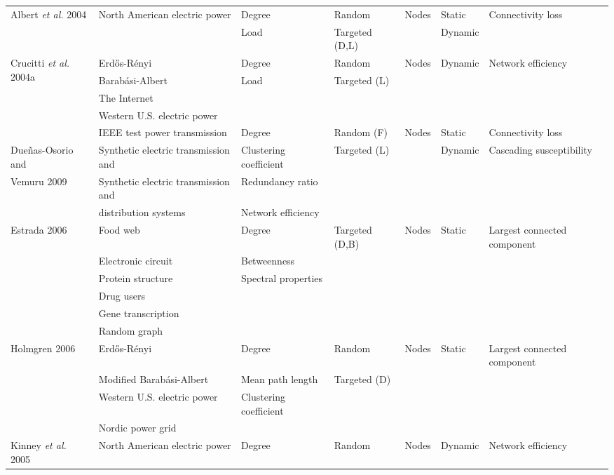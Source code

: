 \begin{landscape}
\begin{table}[h!]
{\begin{tabular}{lllllll}
\multirow{2}{*}{Albert \emph{et al.} 2004 \cite{Albert2004}} & North American electric power & Degree & Random & Nodes & Static & Connectivity loss \\
 &  & Load & Targeted (D,L) &  & Dynamic &  \\ \midrule
\multirow{4}{*}{Crucitti \emph{et al.} 2004a \cite{Crucitti2004a}} & Erd\H{o}s-R\'{e}nyi & Degree & Random & Nodes & Dynamic & Network efficiency \\
 & Barab\'{a}si-Albert & Load & Targeted (L) &  &  &  \\
 & The Internet &  &  &  &  &  \\
 & Western U.S. electric power &  &  &  &  &  \\ \midrule
  & IEEE test power transmission & Degree & Random (F) & Nodes & Static & Connectivity loss \\
Due\~{n}as-Osorio and & Synthetic electric transmission and & Clustering coefficient & Targeted (L) &  & Dynamic & Cascading susceptibility \\
Vemuru 2009 \cite{Duenas-Osorio2009} & Synthetic electric transmission and & Redundancy ratio &  &  &  &  \\
 & distribution systems & Network efficiency &  &  &  &  \\ \midrule
\multirow{6}{*}{Estrada 2006 \cite{Estrada2006}} & Food web & Degree & Targeted (D,B) & Nodes & Static & Largest connected component \\
 & Electronic circuit & Betweenness &  &  &  &  \\
 & Protein structure & Spectral properties &  &  &  &  \\
 & Drug users &  &  &  &  &  \\
 & Gene transcription &  &  &  &  &  \\
 & Random graph &  &  &  &  &  \\ \midrule
\multirow{4}{*}{Holmgren 2006 \cite{Holmgren2006a}} & Erd\H{o}s-R\'{e}nyi & Degree & Random & Nodes & Static & Largest connected component \\
 & Modified Barab\'{a}si-Albert & Mean path length & Targeted (D) &  &  &  \\
 & Western U.S. electric power & Clustering coefficient &  &  &  &  \\
 & Nordic power grid &  &  &  &  &  \\ \midrule
\multirow{2}{*}{Kinney \emph{et al.} 2005 \cite{Kinney2005}} & North American electric power & Degree & Random & Nodes & Dynamic & Network efficiency \\

\end{tabular}}
\end{table}
\end{landscape}
